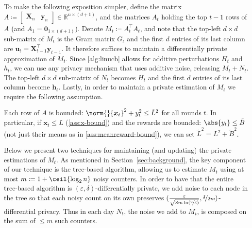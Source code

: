 \documentclass{article}
\renewcommand{\vec}[1]{\bm{#1}}
\newcommand{\defeq}{\coloneq}
\newcommand{\Real}{\mathds{R}}
\DeclarePairedDelimiter{\abs}||
\DeclarePairedDelimiter{\ceil}\lceil\rceil
\providecommand\transp{\top}
\let\transpsymbol\transp
\renewcommand{\transp}[1]{#1^\transpsymbol}
\newcommand{\XtX}[1]{\transp{#1}{#1}}
\begin{document}
To make the following exposition simpler, define the matrix
$A \defeq \begin{bmatrix} \vec X_n & \vec y_n \end{bmatrix} \in
\Real^{n\times(d+1)}$, and the matrices $A_t$ holding the top $t-1$ rows of $A$ (and
$A_1 = \vec 0_{1\times(d+1)}$).  Denote $M_t \defeq \XtX{A_t}$, and note that the top-left $d\times d$
sub-matrix of $M_t$ is the Gram matrix $G_t$ and the
first $d$ entries of its last column are
$\vec u_t = \transp{\vec X_{t-1}}\vec y_{t-1}$.  It therefore suffices
to maintain a differentially private approximation of $M_t$. Since
\cref{alg:linucb} allows for additive perturbations $H_t$ and $h_t$,
we can use any privacy mechanism that uses additive noise, releasing
$M_t + N_t$.  The top-left $d\times d$ sub-matrix of $N_t$ becomes
$H_t$ and the first $d$ entries of its last column become $\vec h_t$. Lastly, in order to maintain a private estimation of $M_t$ we require the following assumption.
\begin{assumption}\label{ass:bounded-data}
  Each row of $A$ is bounded:
  $\norm{}{\vec x_t}^2 + y_t^2 \le \tilde L^2$ for all rounds $t$.  In
  particular, if $\vec x_t \le L$ (\cref{ass:x-bound}) and
  the rewards are bounded: $\abs{y_t} \le \tilde B$ (not just their
  means as in \cref{ass:meanreward-bound}), we can set $\tilde L^2 = L^2 + \tilde B^2$.
\end{assumption}
Below we present two techniques for maintaining (and updating) the private estimations of $M_t$. As mentioned in Section~\ref{sec:background}, the key component of our technique is the tree-based algorithm, allowing us to estimate $M_t$ using at most $m \defeq 1 + \ceil{\log_2n}$ noisy counters. In order to have that the entire tree-based algorithm is $(\varepsilon,\delta)$-differentially private, we add noise to each node in the tree so that each noisy count on its own preserves $(\tfrac{\varepsilon}{\sqrt{8m\ln(\nicefrac{2}{\delta})}}, \nicefrac{\delta}{2m})$-differential privacy. Thus in each day $N_t$, the noise we add to $M_t$, is composed on the sum of $\leq m$ such counters.


\end{document}
